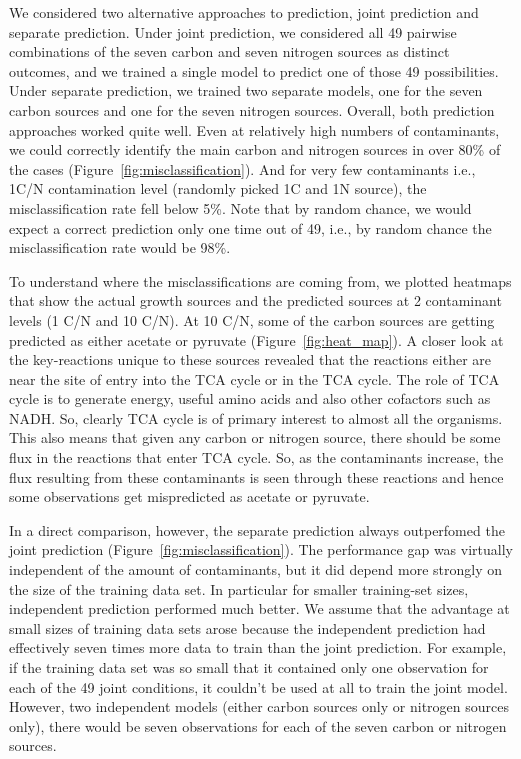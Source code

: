 \documentclass[12pt]{article}
\begin{document}
We considered two alternative approaches to prediction, joint prediction and separate prediction. Under joint prediction, we considered all 49 pairwise combinations of the seven carbon and seven nitrogen sources as distinct outcomes, and we trained a single model to predict one of those 49 possibilities. Under separate prediction, we trained two separate models, one for the seven carbon sources and one for the seven nitrogen sources. Overall, both prediction approaches worked quite well.  Even at relatively high numbers of contaminants, we could correctly identify the main carbon and nitrogen sources in over 80\% of the cases (Figure~\ref{fig:misclassification}).  And for very few contaminants i.e., 1C/N contamination level (randomly picked 1C and 1N source), the misclassification rate fell below 5\%. Note that by random chance, we would expect a correct prediction only one time out of 49, i.e., by random chance the misclassification rate would be 98\%.

To understand where the misclassifications are coming from, we plotted heatmaps that show the actual growth sources and the predicted sources at 2 contaminant levels (1 C/N and 10 C/N). At 10 C/N, some of the carbon sources are getting predicted as either acetate or pyruvate (Figure~\ref{fig:heat_map}). A closer look at the key-reactions unique to these sources revealed that the reactions either are near the site of entry into the TCA cycle or in the TCA cycle. The role of TCA cycle is to generate energy, useful amino acids and also other cofactors such as NADH. So, clearly TCA cycle is of primary interest to almost all the organisms. This also means that given any carbon or nitrogen source, there should be some flux in the reactions that enter TCA cycle. So, as the contaminants increase, the flux resulting from these contaminants is seen through these reactions and hence some observations get mispredicted as acetate or pyruvate. 

In a direct comparison, however, the separate prediction always outperfomed the joint prediction (Figure~\ref{fig:misclassification}). The performance gap was virtually independent of the amount of contaminants, but it did depend more strongly on the size of the training data set. In particular for smaller training-set sizes, independent prediction performed much better. We assume that the advantage at small sizes of training data sets arose because the independent prediction had effectively seven times more data to train than the joint prediction. For example, if the training data set was so small that it contained only one observation for each of the 49 joint conditions, it couldn't be used at all to train the joint model. However, two independent models (either carbon sources only or nitrogen sources only), there would be seven observations for each of the seven carbon or nitrogen sources.
\end{document}
